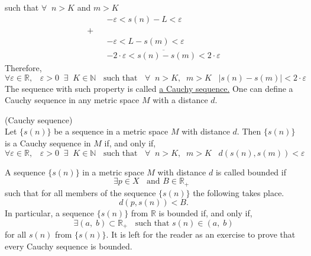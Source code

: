 \documentclass[color=black,11pt]{elegantpaper}
\begin{document}
such that $\forall\;\;n>K$ and $m>K$
\begin{eqnarray*}
&&- \varepsilon < s(n) - L < \varepsilon\\
+&&\\
&&- \varepsilon <  L - s(m) < \varepsilon\\
&&\overline{-2 \cdot \varepsilon  < s(n)-s(m) < 2\cdot \varepsilon}
\end{eqnarray*}
Therefore,
$$
\forall \varepsilon \in \mathbb{R},  \;\;\; \varepsilon >0\;\;\exists\;\;K\in \mathbb{N}\;\;\mbox{ such that }\;\;\forall\;\;n>K,\;\;m>K\;\;\;|s(n) - s(m)| < 2\cdot \varepsilon 
$$
The sequence with such property is called \href{https://en.wikipedia.org/wiki/Cauchy_sequence}{a Cauchy sequence.} One can define a Cauchy sequence in any metric space $M$ with a distance $d.$
\begin{definition} (Cauchy sequence)\\
Let $\{s(n)\}$ be a sequence in a metric space $M$ with distance $d.$ Then $\{s(n)\}$  is a Cauchy sequence in $M$ if, and only if,
$$
\forall \varepsilon \in \mathbb{R},  \;\;\; \varepsilon >0\;\;\exists\;\;K\in \mathbb{N}\;\;\mbox{ such that }\;\;\forall\;\;n>K,\;\;m>K\;\;\;d(s(n) , s(m)) <  \varepsilon 
$$
\end{definition}
A sequence $\{s(n)\}$ in a metric space $M$ with distance $d$ is called bounded if  
$$
\exists p\in X\;\;\mbox{ and } B\in \mathbb{R}_{+}\;\;
$$
such that for all members of the sequence $\{s(n)\}$ the following takes place.
$$
d(p,s(n))<B.
$$
In particular, a sequence $\{s(n)\}$ from $\mathbb{R}$ is bounded if, and only if,
$$
\exists (a,\;b) \subset \mathbb{R}_{+} \;\;\mbox{ such that } s(n) \in (a,\;b) 
$$
for all $s(n)$ from $\{s(n)\}.$ It is left for the reader as an exercise to prove that every Cauchy sequence is bounded.
\end{document}
